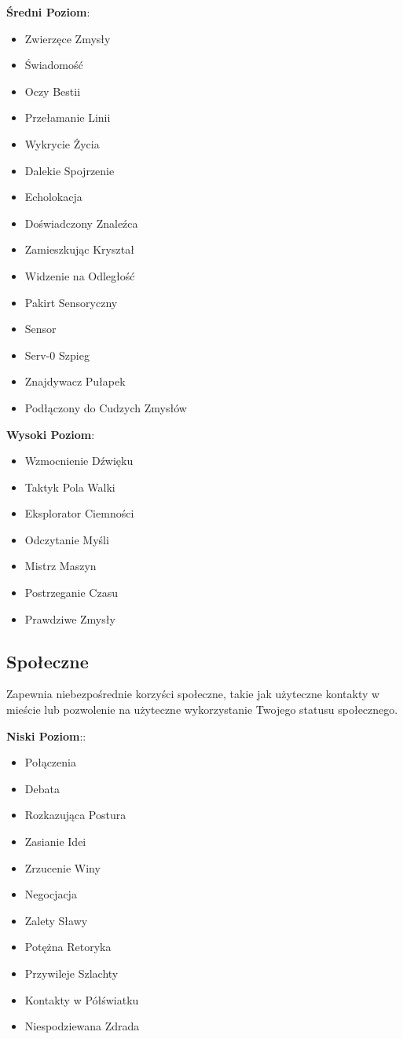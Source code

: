 \textbf{Średni Poziom}:

\begin{itemize}
\item Zwierzęce Zmysły
\item Świadomość
\item Oczy Bestii
\item Przełamanie Linii
\item Wykrycie Życia
\item Dalekie Spojrzenie
\item Echolokacja
\item Doświadczony Znaleźca
\item Zamieszkując Kryształ
\item Widzenie na Odległość
\item Pakirt Sensoryczny
\item Sensor
\item Serv-0 Szpieg
\item Znajdywacz Pułapek
\item Podłączony do Cudzych Zmysłów
\end{itemize}

\textbf{Wysoki Poziom}:

\begin{itemize}
\item Wzmocnienie Dźwięku
\item Taktyk Pola Walki
\item Eksplorator Ciemności
\item Odczytanie Myśli
\item Mistrz Maszyn
\item Postrzeganie Czasu
\item Prawdziwe Zmysły
\end{itemize}

\subsection{Społeczne}

Zapewnia niebezpośrednie korzyści społeczne, takie jak użyteczne kontakty w mieście lub pozwolenie na użyteczne wykorzystanie Twojego statusu społecznego.

\textbf{Niski Poziom}::

\begin{itemize}
\item Połączenia
\item Debata
\item Rozkazująca Postura
\item Zasianie Idei
\item Zrzucenie Winy
\item Negocjacja
\item Zalety Sławy
\item Potężna Retoryka
\item Przywileje Szlachty
\item Kontakty w Półświatku
\item Niespodziewana Zdrada
\end{itemize}

